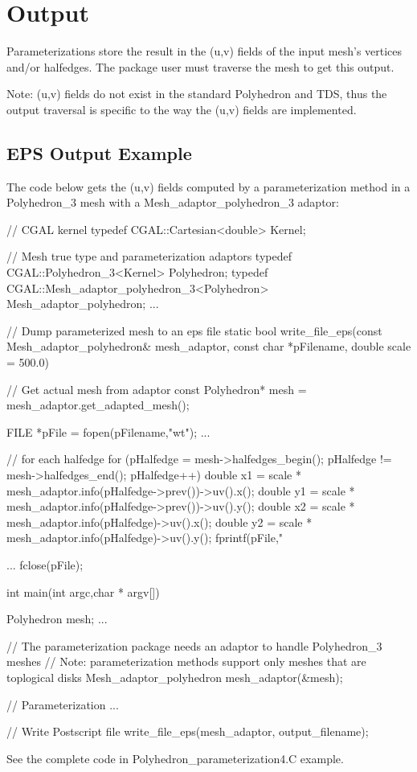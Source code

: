 \section{Output}

Parameterizations store the result in the (u,v) fields of the input mesh's vertices
and/or halfedges. The package user must traverse the mesh to get this output.

Note: (u,v) fields do not exist in the standard Polyhedron and TDS, thus
the output traversal is specific to the way the (u,v) fields are implemented.

\subsection{EPS Output Example}

The code below gets the (u,v) fields computed by a parameterization method
in a Polyhedron\_3 mesh with a Mesh\_adaptor\_polyhedron\_3 adaptor:

\begin{ccExampleCode}

// CGAL kernel
typedef CGAL::Cartesian<double>                         Kernel;

// Mesh true type and parameterization adaptors
typedef CGAL::Polyhedron_3<Kernel>                      Polyhedron;
typedef CGAL::Mesh_adaptor_polyhedron_3<Polyhedron>     Mesh_adaptor_polyhedron;
...

// Dump parameterized mesh to an eps file
static bool write_file_eps(const Mesh_adaptor_polyhedron& mesh_adaptor,
                           const char *pFilename,
                           double scale = 500.0)
{
    // Get actual mesh from adaptor
    const Polyhedron* mesh = mesh_adaptor.get_adapted_mesh();

    FILE *pFile = fopen(pFilename,"wt");
    ...

    // for each halfedge
    for (pHalfedge = mesh->halfedges_begin();
         pHalfedge != mesh->halfedges_end();
         pHalfedge++)
    {
        double x1 = scale * mesh_adaptor.info(pHalfedge->prev())->uv().x();
        double y1 = scale * mesh_adaptor.info(pHalfedge->prev())->uv().y();
        double x2 = scale * mesh_adaptor.info(pHalfedge)->uv().x();
        double y2 = scale * mesh_adaptor.info(pHalfedge)->uv().y();
        fprintf(pFile,"%
    }

    ...
    fclose(pFile);
}

int main(int argc,char * argv[])
{
    Polyhedron mesh;
    ...

    // The parameterization package needs an adaptor to handle Polyhedron_3 meshes
    // Note: parameterization methods support only meshes that are toplogical disks
    Mesh_adaptor_polyhedron mesh_adaptor(&mesh);

    // Parameterization
    ...

    // Write Postscript file
    write_file_eps(mesh_adaptor, output_filename);
}

\end{ccExampleCode}

See the complete code in Polyhedron\_parameterization4.C example.